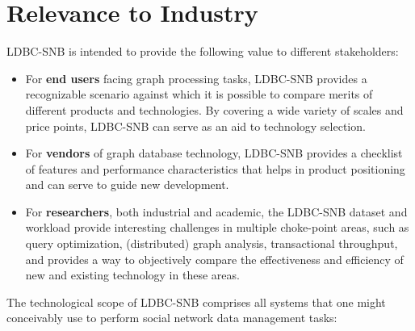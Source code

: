 \section{Relevance to Industry}

LDBC-SNB is intended to provide the following value to different stakeholders:

\begin{itemize}
 \item For \textbf{end users} facing graph processing tasks, LDBC-SNB provides
     a recognizable scenario against which it is possible to compare merits of
     different products and technologies.  By covering a wide variety of scales
     and price points, LDBC-SNB can serve as an aid to technology selection.
 \item For \textbf{vendors} of graph database technology, LDBC-SNB provides a
     checklist of features and performance characteristics that helps in
     product positioning and can serve to guide new development.
 \item For \textbf{researchers}, both industrial and academic, the LDBC-SNB
     dataset and workload provide interesting challenges in multiple
     choke-point areas, such as query optimization, (distributed) graph
     analysis, transactional throughput, and provides a way to objectively
     compare the effectiveness and efficiency of new and existing technology in
     these areas.
\end{itemize}

The technological scope of LDBC-SNB comprises all systems that one might
conceivably use to perform social network data management tasks:

